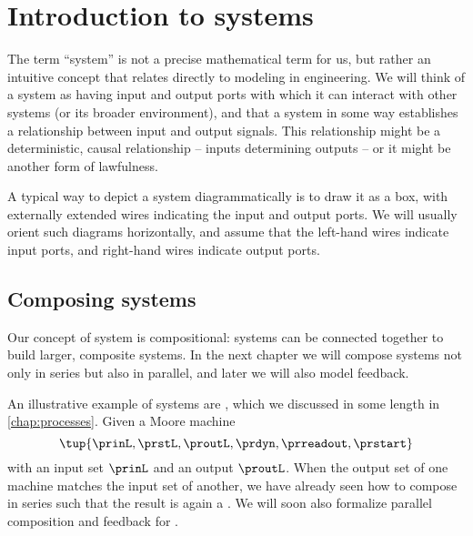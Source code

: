 
\section{Introduction to systems}


The term ``system'' is not a precise mathematical term for us, but rather an intuitive concept that relates directly to modeling in engineering.
We will think of a system as having input and output ports with which it can interact with other systems (or its broader environment), and that a system in some way establishes a relationship between input and output signals.
This relationship might be a deterministic, causal relationship -- inputs determining outputs -- or it might be another form of lawfulness.

A typical way to depict a system diagrammatically is to draw it as a box, with externally extended wires indicating the input and output ports.
We will usually orient such diagrams horizontally, and assume that the left-hand wires indicate input ports, and right-hand wires indicate output ports.


\subsection{Composing systems}

Our concept of system is compositional: systems can be connected together to build larger, composite systems.
In the next chapter we will compose systems not only in series but also in parallel, and later we will also model feedback.

An illustrative example of systems are , which we discussed in some length in \cref{chap:processes}.
Given a Moore machine
\begin{equation}
    \label{eq:moore-machine-specification}
    \tup{\prinL,\prstL,\proutL,\prdyn,\prreadout,\prstart}
\end{equation}
with an input set $\prinL$ and an output $\proutL$.
When the output set of one machine matches the input set of another, we have already seen how to compose  in series such that the result is again a .
We will soon also formalize parallel composition and feedback for .

